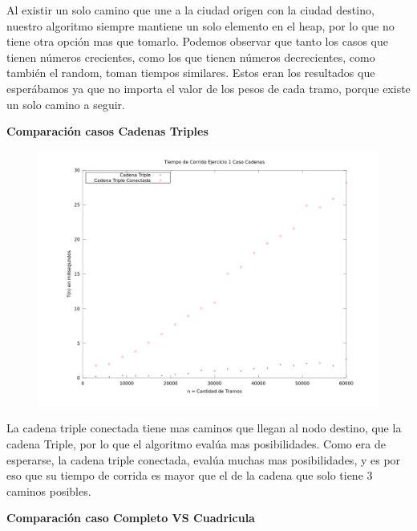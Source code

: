 \indent Al existir un solo camino que une a la ciudad origen con la ciudad
destino, nuestro algoritmo siempre mantiene un solo elemento en el heap, por lo
que no tiene otra opción mas que tomarlo. Podemos observar que tanto los casos
que tienen números crecientes, como los que tienen números decrecientes, como
también el random, toman tiempos similares. Estos eran los resultados que
esperábamos ya que no importa el valor de los pesos de cada tramo, porque existe
un solo camino a seguir.\\

\clearpage

\textbf{Comparación casos Cadenas Triples}

\begin{figure}[h]
	\centering
	\includegraphics[width=450px]{./figs/cadenasTriples.png}
\end{figure}

\indent La cadena triple conectada tiene mas caminos que llegan al nodo destino,
que la cadena Triple, por lo que el algoritmo evalúa mas posibilidades. Como era
de esperarse, la cadena triple conectada, evalúa muchas mas posibilidades, y es
por eso que su tiempo de corrida es mayor que el de la cadena que solo tiene 3
caminos posibles.\\ 


\clearpage

\textbf{Comparación caso Completo VS Cuadricula}

